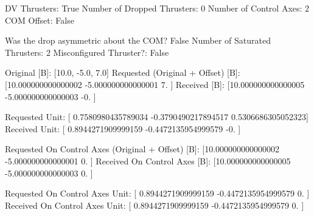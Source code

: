 DV Thrusters:	True
Number of Dropped Thrusters:	0
Number of Control Axes:	2
COM Offset:	False

Was the drop asymmetric about the COM?	False
Number of Saturated Thrusters:	2
Misconfigured Thruster?:	False

Original [B]:	[10.0, -5.0, 7.0]
Requested (Original + Offset) [B]:	[10.000000000000002 -5.000000000000001  7.               ]
Received [B]:		[10.000000000000005 -5.000000000000003 -0.               ]

Requested Unit:		[ 0.7580980435789034 -0.3790490217894517  0.5306686305052323]
Received Unit:		[ 0.8944271909999159 -0.4472135954999579 -0.                ]

Requested On Control Axes (Original + Offset) [B]:	[10.000000000000002 -5.000000000000001  0.               ]
Received On Control Axes [B]:		[10.000000000000005 -5.000000000000003  0.               ]

Requested On Control Axes Unit:		[ 0.8944271909999159 -0.4472135954999579  0.                ]
Received On Control Axes Unit:		[ 0.8944271909999159 -0.4472135954999579  0.                ]

